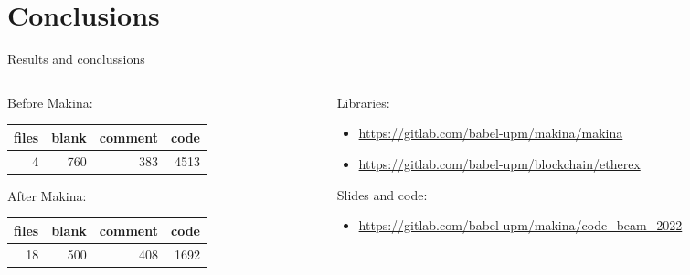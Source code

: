 \documentclass[aspectratio=169, 10pt, handout]{beamer}
\begin{document}
\section{Conclusions}
\label{sec:orgdd9b0e6}
\begin{frame}[label={sec:orgbcd753f}]{Results and conclussions}
\begin{columns}
\begin{column}{0.38\columnwidth}
Before Makina:
\begin{center}
\begin{tabular}{rrrr}
files & blank & comment & code\\
\hline
4 & 760 & 383 & 4513\\
\end{tabular}
\end{center}

\vspace{10pt}

After Makina:
\begin{center}
\begin{tabular}{rrrr}
files & blank & comment & code\\
\hline
18 & 500 & 408 & 1692\\
\end{tabular}
\end{center}
\end{column}

\begin{column}{0.58\columnwidth}
Libraries:
\begin{itemize}
\item \url{https://gitlab.com/babel-upm/makina/makina}
\item \url{https://gitlab.com/babel-upm/blockchain/etherex}
\end{itemize}

Slides and code:  
\begin{itemize}
\item \url{https://gitlab.com/babel-upm/makina/code\_beam\_2022}
\end{itemize}
\end{column}
\end{columns}
\end{frame}
\end{document}
